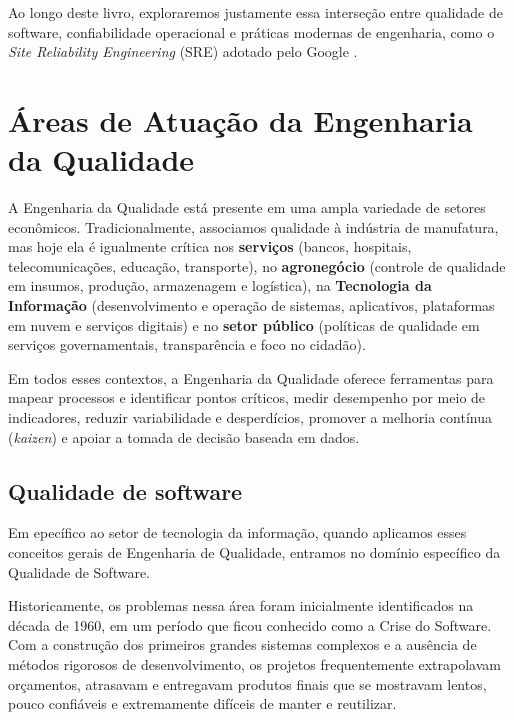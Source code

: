 \documentclass[12pt,a4paper,twoside]{report}
\begin{document}
Ao longo deste livro, exploraremos justamente essa interseção entre
qualidade de software, confiabilidade operacional e práticas modernas de
engenharia, como o \emph{Site Reliability Engineering} (SRE) adotado pelo
Google \cite{beyer2016sre, googlesre2024}.


\section{Áreas de Atuação da Engenharia da Qualidade}

A Engenharia da Qualidade está presente em uma ampla variedade de setores
econômicos. Tradicionalmente, associamos qualidade à indústria de
manufatura, mas hoje ela é igualmente crítica nos \textbf{serviços} (bancos,
hospitais, telecomunicações, educação, transporte), no \textbf{agronegócio}
(controle de qualidade em insumos, produção, armazenagem e logística), na
\textbf{Tecnologia da Informação} (desenvolvimento e operação de sistemas,
aplicativos, plataformas em nuvem e serviços digitais) e no \textbf{setor
público} (políticas de qualidade em serviços governamentais, transparência e
foco no cidadão).

Em todos esses contextos, a Engenharia da Qualidade oferece ferramentas para
mapear processos e identificar pontos críticos, medir desempenho por meio de
indicadores, reduzir variabilidade e desperdícios, promover a melhoria contínua
(\emph{kaizen}) e apoiar a tomada de decisão baseada em dados.

\subsection{Qualidade de software}
Em epecífico ao setor de tecnologia da informação, quando aplicamos esses conceitos gerais de Engenharia de Qualidade, entramos no domínio específico da Qualidade de Software. 

Historicamente, os problemas nessa área foram inicialmente identificados na década de 1960, em um período que ficou conhecido como a Crise do Software. Com a construção dos primeiros grandes sistemas complexos e a ausência de métodos rigorosos de desenvolvimento, os projetos frequentemente extrapolavam orçamentos, atrasavam e entregavam produtos finais que se mostravam lentos, pouco confiáveis e extremamente difíceis de manter e reutilizar. 
\end{document}
